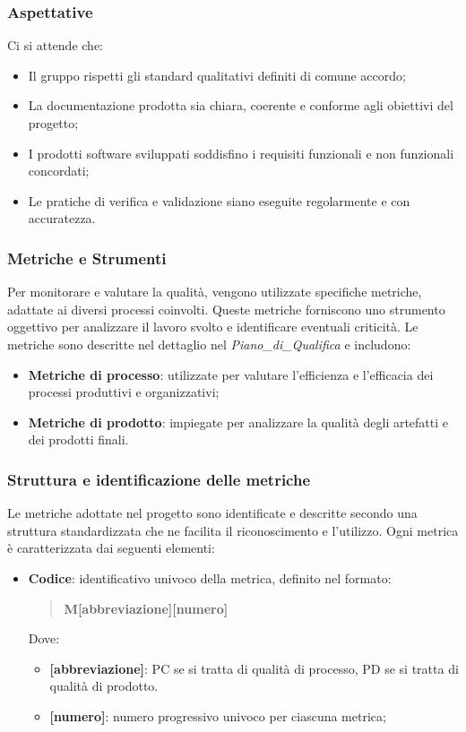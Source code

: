 \documentclass[10pt]{article}
\begin{document}
\begin{justify}
    \subsubsection{Aspettative}
    Ci si attende che:
    \begin{itemize}
        \item Il gruppo rispetti gli standard qualitativi definiti di comune accordo;
        \item La documentazione prodotta sia chiara, coerente e conforme agli obiettivi del progetto;
        \item I prodotti software sviluppati soddisfino i requisiti funzionali e non funzionali concordati;
        \item Le pratiche di verifica e validazione siano eseguite regolarmente e con accuratezza.
    \end{itemize}
    
    \subsubsection{Metriche e Strumenti}
    Per monitorare e valutare la qualità, vengono utilizzate specifiche metriche, adattate ai diversi processi coinvolti. Queste metriche forniscono uno strumento oggettivo per analizzare il lavoro svolto e identificare eventuali criticità. Le metriche sono descritte nel dettaglio nel \textit{Piano\_di\_Qualifica} e includono:
    \begin{itemize}
        \item \textbf{Metriche di processo}: utilizzate per valutare l'efficienza e l'efficacia dei processi produttivi e organizzativi;
        \item \textbf{Metriche di prodotto}: impiegate per analizzare la qualità degli artefatti e dei prodotti finali.
    \end{itemize}
    
    \subsubsection{Struttura e identificazione delle metriche}
    Le metriche adottate nel progetto sono identificate e descritte secondo una struttura standardizzata che ne facilita il riconoscimento e l'utilizzo. Ogni metrica è caratterizzata dai seguenti elementi:
    \begin{itemize}
        \item \textbf{Codice}: identificativo univoco della metrica, definito nel formato:
    \begin{quote}
        \textbf{M[abbreviazione][numero]}
    \end{quote}
    Dove:
    \begin{itemize}
        \item \textbf{[abbreviazione]}: PC se si tratta di qualità di processo, PD se si tratta di qualità di prodotto.
        \item \textbf{[numero]}: numero progressivo univoco per ciascuna metrica;
    \end{itemize}
    

\end{itemize}
\end{justify}
\end{document}
